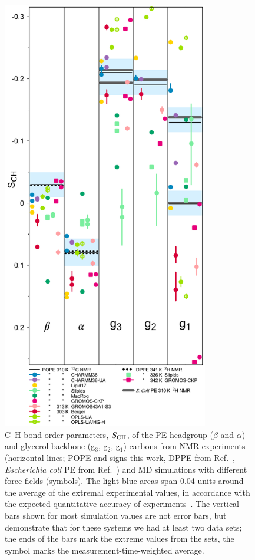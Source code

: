 \documentclass[journal=jpcbfk]{achemso}
\begin{document}
\begin{figure}[]
  \centering
  \includegraphics[width=9.0cm]{./Figs/HGorderparametersPE.pdf}
  \caption{\label{HGorderParametersPE}
    C--H bond order parameters, $S_{\rm CH}$, of the PE headgroup ($\beta$ and $\alpha$) and
    glycerol backbone (g$_3$, g$_2$, g$_1$) carbons from NMR experiments (horizontal lines;
    POPE and signs this work, DPPE from Ref.~,
    {\it Escherichia coli} PE from Ref.~)
    and MD simulations with different force fields (symbols).
    The light blue areas span 0.04 units around the average of the extremal experimental values,
    in accordance with the expected quantitative accuracy of experiments~\cite{ollila16}.
    The vertical bars shown for most simulation values are not error bars,
    but demonstrate that for these systems we had at least two data sets;
    the ends of the bars mark the extreme values from the sets,
    the symbol marks the measurement-time-weighted average.
  }
\end{figure}
\end{document}
